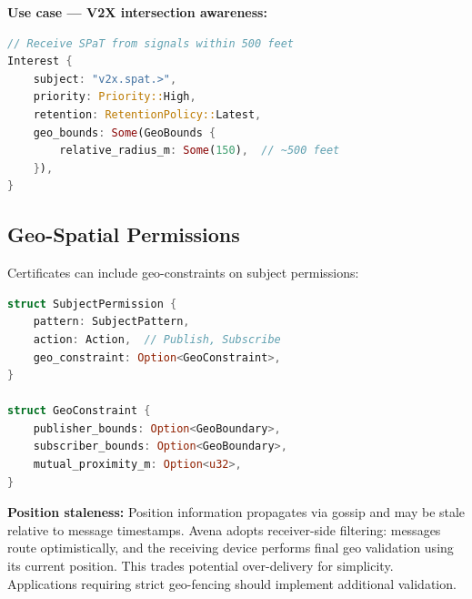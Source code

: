 \textbf{Use case --- V2X intersection awareness:}

\begin{lstlisting}[language=Rust]
// Receive SPaT from signals within 500 feet
Interest {
    subject: "v2x.spat.>",
    priority: Priority::High,
    retention: RetentionPolicy::Latest,
    geo_bounds: Some(GeoBounds {
        relative_radius_m: Some(150),  // ~500 feet
    }),
}
\end{lstlisting}

\subsection{Geo-Spatial Permissions}

Certificates can include geo-constraints on subject permissions:

\begin{lstlisting}[language=Rust]
struct SubjectPermission {
    pattern: SubjectPattern,
    action: Action,  // Publish, Subscribe
    geo_constraint: Option<GeoConstraint>,
}

struct GeoConstraint {
    publisher_bounds: Option<GeoBoundary>,
    subscriber_bounds: Option<GeoBoundary>,
    mutual_proximity_m: Option<u32>,
}
\end{lstlisting}

\textbf{Position staleness:} Position information propagates via gossip and may be stale relative to message timestamps. Avena adopts receiver-side filtering: messages route optimistically, and the receiving device performs final geo validation using its current position. This trades potential over-delivery for simplicity. Applications requiring strict geo-fencing should implement additional validation.

